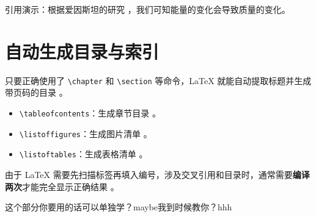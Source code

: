 引用演示：根据爱因斯坦的研究 \cite{Einstein1905}，我们可知能量的变化会导致质量的变化。

\section{自动生成目录与索引}

只要正确使用了 \texttt{\textbackslash chapter} 和 \texttt{\textbackslash section} 等命令，\LaTeX{} 就能自动提取标题并生成带页码的目录 。

\begin{itemize}
	\item \texttt{\textbackslash tableofcontents}：生成章节目录 。
	\item \texttt{\textbackslash listoffigures}：生成图片清单 。
	\item \texttt{\textbackslash listoftables}：生成表格清单 。
\end{itemize}

\begin{tcolorbox}[colback=red!5, colframe=red!50, title=使用技巧]
	由于 \LaTeX{} 需要先扫描标签再填入编号，涉及交叉引用和目录时，通常需要\textbf{编译两次}才能完全显示正确结果 。
\end{tcolorbox}

这个部分你要用的话可以单独学？maybe我到时候教你？hhh
